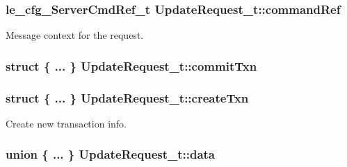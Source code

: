 \subsubsection[{\texorpdfstring{command\+Ref}{commandRef}}]{\setlength{\rightskip}{0pt plus 5cm}le\+\_\+cfg\+\_\+\+Server\+Cmd\+Ref\+\_\+t Update\+Request\+\_\+t\+::command\+Ref}\hypertarget{struct_update_request__t_a3567a0bf4b68648f11e7c37d3669377a}{}\label{struct_update_request__t_a3567a0bf4b68648f11e7c37d3669377a}


Message context for the request. 

\subsubsection[{\texorpdfstring{commit\+Txn}{commitTxn}}]{\setlength{\rightskip}{0pt plus 5cm}struct \{ ... \} 
         Update\+Request\+\_\+t\+::commit\+Txn}\hypertarget{struct_update_request__t_a95fde185952ed8aa46b7280e4bc5d388}{}\label{struct_update_request__t_a95fde185952ed8aa46b7280e4bc5d388}
\subsubsection[{\texorpdfstring{create\+Txn}{createTxn}}]{\setlength{\rightskip}{0pt plus 5cm}struct \{ ... \} 
         Update\+Request\+\_\+t\+::create\+Txn}\hypertarget{struct_update_request__t_a7f0e0358c6dbbf9f2f755395e53fbba0}{}\label{struct_update_request__t_a7f0e0358c6dbbf9f2f755395e53fbba0}


Create new transaction info. 

\subsubsection[{\texorpdfstring{data}{data}}]{\setlength{\rightskip}{0pt plus 5cm}union \{ ... \} 
     Update\+Request\+\_\+t\+::data}\hypertarget{struct_update_request__t_aa8ef0aa88764ea6c600c99e725194763}{}\label{struct_update_request__t_aa8ef0aa88764ea6c600c99e725194763}
